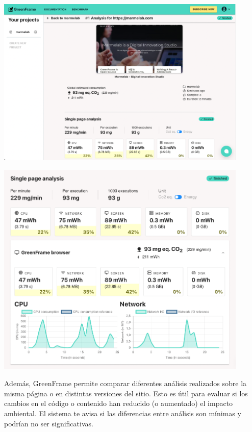 \documentclass[12pt,a4paper]{report}
\begin{document}
\begin{center}
  \includegraphics[width=0.9\textwidth]{imagenes/Greenframe_5.png}
\end{center}

\begin{center}
  \includegraphics[width=0.9\textwidth]{imagenes/Greenframe_6.png}
\end{center}

Además, GreenFrame permite comparar diferentes análisis realizados sobre la
misma página o en distintas versiones del sitio. Esto es útil para evaluar si
los cambios en el código o contenido han reducido (o aumentado) el impacto
ambiental. El sistema te avisa si las diferencias entre análisis son mínimas y
podrían no ser significativas.
\end{document}
